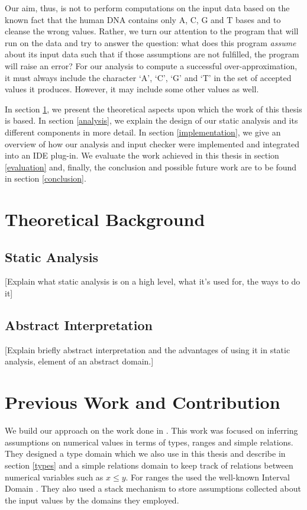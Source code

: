 \documentclass[10pt]{report}
\begin{document}
Our aim, thus, is not to perform computations on the input data based on the known fact that the human DNA contains only A, C, G and T bases and to cleanse the wrong values. Rather, we turn our attention to the program that will run on the data and try to answer the question: what does this program \textit{assume} about its input data such that if those assumptions are not fulfilled, the program will raise an error? For our analysis to compute a successful over-approximation, it must always include the character `A', `C', `G' and `T' in the set of accepted values it produces. However, it may include some other values as well. 

In section \ref{theoretical}, we present the theoretical aspects upon which the work of this thesis is based. In section \ref{analysis}, we explain the design of our static analysis and its different components in more detail. In section \ref{implementation}, we give an overview of how our analysis and input checker were implemented and integrated into an IDE plug-in. We evaluate the work achieved in this thesis in section \ref{evaluation} and, finally, the conclusion and possible future work are to be found in section \ref{conclusion}. 

\section{Theoretical Background} \label{theoretical}
\subsection{Static Analysis}
[Explain what static analysis is on a high level, what it's used for, the ways to do it]
\subsection{Abstract Interpretation}
[Explain briefly abstract interpretation and the advantages of using it in static analysis, element of an abstract domain.]

\section{Previous Work and Contribution}

We build our approach on the work done in \cite{madelin}. This work was focused on inferring assumptions on numerical values in terms of types, ranges and simple relations. They designed a type domain which we also use in this thesis and describe in section \ref{types} and a simple relations domain to keep track of relations between numerical variables such as $ x \leq y $. For ranges the used the well-known Interval Domain \cite{cousot}. They also used a stack mechanism to store assumptions collected about the input values by the domains they employed. 
\end{document}
